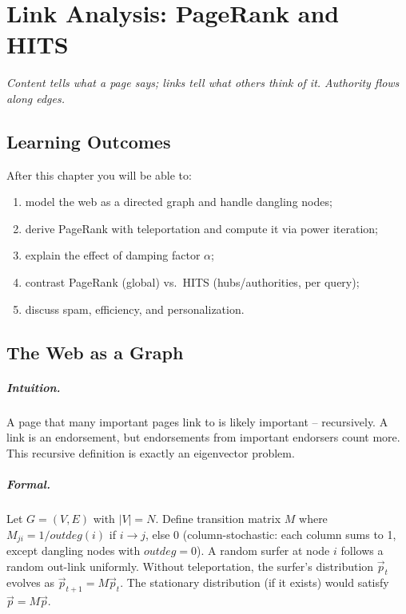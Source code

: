 \chapter{Link Analysis: PageRank and HITS}\label{ch:pagerank}
\begin{center}\small\textit{Content tells what a page says; links tell what others think of it. Authority flows along edges.}\end{center}

\noindent{}
\vspace{0.4em}

\section*{Learning Outcomes}
After this chapter you will be able to:
\begin{enumerate}[label=(L\arabic*)]
  \item model the web as a directed graph and handle dangling nodes;
  \item derive PageRank with teleportation and compute it via power iteration;
  \item explain the effect of damping factor $\alpha$;
  \item contrast PageRank (global) vs.\ HITS (hubs/authorities, per query);
  \item discuss spam, efficiency, and personalization.
\end{enumerate}

\section{The Web as a Graph}\label{sec:web-graph}
\paragraph{Intuition.} A page that many important pages link to is likely important -- recursively. A link is an endorsement, but endorsements from important endorsers count more. This recursive definition is exactly an eigenvector problem.

\paragraph{Formal.} Let $G=(V,E)$ with $|V|=N$. Define transition matrix $M$ where $M_{ji}=1/outdeg(i)$ if $i\to j$, else $0$ (column-stochastic: each column sums to 1, except dangling nodes with $outdeg=0$). A random surfer at node $i$ follows a random out-link uniformly. Without teleportation, the surfer's distribution $\vec{p}_t$ evolves as $\vec{p}_{t+1}=M\vec{p}_t$. The stationary distribution (if it exists) would satisfy $\vec{p}=M\vec{p}$.

